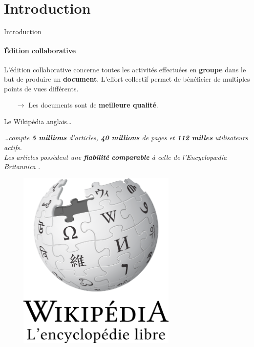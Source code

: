 \section{Introduction}


\begin{frame}{Introduction}\framesubtitle{Édition collaborative}

  L'édition collaborative concerne toutes les activités effectuées en
  \textbf{groupe} dans le but de produire un \textbf{document}. L'effort
  collectif permet de bénéficier de multiples points de vues différents.

  \begin{itemize}
  \item[$\rightarrow$] Les documents sont de \textbf{meilleure qualité}.
  \end{itemize}
  
  \vspace{0.25cm}

  \noindent
  \begin{exampleblock}{Le Wikipédia anglais\ldots}
  \begin{minipage}{0.6\textwidth}
    \textit{\ldots compte \textbf{5 millions} d'articles,
      \textbf{40 millions} de pages et \textbf{112 milles} utilisateurs
      actifs.\\Les articles possèdent une \textbf{fiabilité} \textbf{comparable}
      à celle de l'Encyclopædia Britannica \REF.}

  \end{minipage}
  \hfill
  \begin{minipage}{0.3\textwidth}
    \begin{figure}
      \begin{center}
        \includegraphics[width=0.7\textwidth]{img/wikipedia.png}
      \end{center}
    \end{figure}
  \end{minipage}
  \end{exampleblock}

\end{frame}


